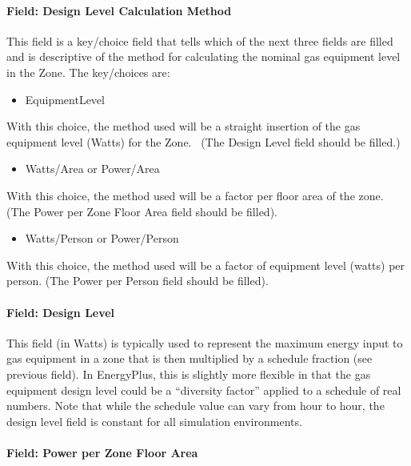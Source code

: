 \paragraph{Field: Design Level Calculation Method}\label{field-design-level-calculation-method-2}

This field is a key/choice field that tells which of the next three fields are filled and is descriptive of the method for calculating the nominal gas equipment level in the Zone. The key/choices are:

\begin{itemize}
\tightlist
\item
  EquipmentLevel
\end{itemize}

With this choice, the method used will be a straight insertion of the gas equipment level (Watts) for the Zone.~ (The Design Level field should be filled.)

\begin{itemize}
\tightlist
\item
  Watts/Area or Power/Area
\end{itemize}

With this choice, the method used will be a factor per floor area of the zone. (The Power per Zone Floor Area field should be filled).

\begin{itemize}
\tightlist
\item
  Watts/Person or Power/Person
\end{itemize}

With this choice, the method used will be a factor of equipment level (watts) per person. (The Power per Person field should be filled).

\paragraph{Field: Design Level}\label{field-design-level-1-000}

This field (in Watts) is typically used to represent the maximum energy input to gas equipment in a zone that is then multiplied by a schedule fraction (see previous field). In EnergyPlus, this is slightly more flexible in that the gas equipment design level could be a ``diversity factor'' applied to a schedule of real numbers. Note that while the schedule value can vary from hour to hour, the design level field is constant for all simulation environments.

\paragraph{Field: Power per Zone Floor Area}\label{field-power-per-zone-floor-area}

